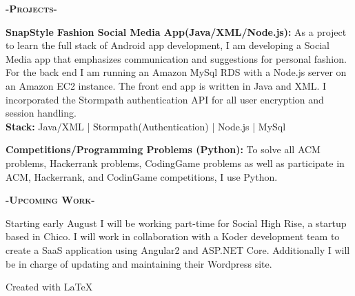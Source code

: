 \documentclass[12pt]{article}
\begin{document}
\begin{center}
\textbf{\textsc{-Projects-}}\\
\end{center}
\begin{footnotesize}

\flushleft
\color{Cerulean}\textbf{SnapStyle Fashion Social Media App(Java/XML/Node.js):} 
\color{Black}As a project to learn the full stack of Android app development, I am developing a Social Media app that emphasizes communication and suggestions for personal fashion. For the back end I am running an \color{TealBlue}Amazon MySql RDS \color{Black}with a \color{TealBlue}Node.js \color{Black} server on an \color{TealBlue}Amazon EC2 \color{Black}instance. The front end app is written in \color{TealBlue}Java and XML. \color{Black} I incorporated the \color{TealBlue}Stormpath \color{Black}authentication API for all user encryption and session handling.\\
\smallskip
\setlength\parindent{24pt}\textbf{Stack:} \color{TealBlue} Java/XML | Stormpath(Authentication) | Node.js | MySql
\bigskip

\setlength\parindent{0pt}
\color{Cerulean}\textbf{Competitions/Programming Problems (Python):}
\color{Black}To solve all ACM problems, Hackerrank problems, CodingGame problems as well as participate in ACM, Hackerrank, and CodinGame competitions, I use \color{TealBlue}Python.\color{Black}

\bigskip
\begin{center}
\textbf{\textsc{-Upcoming Work-}}\\
\end{center}

\color{black}Starting early August I will be working part-time for Social High Rise, a startup based in Chico. I will work in collaboration with a \color{TealBlue}Koder \color{black} development team to create a SaaS application using \color{TealBlue}Angular2 \color{black}and \color{TealBlue}ASP.NET Core\color{black}. Additionally I will be in charge of updating and maintaining their \color{TealBlue}Wordpress \color{black} site.

\end{footnotesize}

\center
Created with \LaTeX
\end{document}
